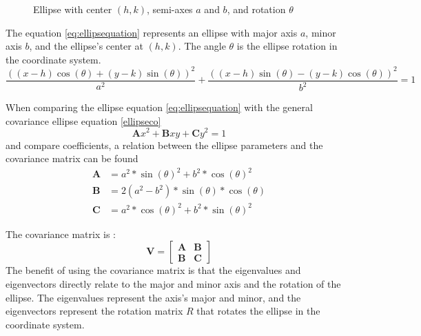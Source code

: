 \begin{figure}[h]
    \centering
    \caption{Ellipse with center $(h,k)$, semi-axes $a$ and $b$, and rotation $\theta$}
    \label{fig:sampleellipse}
\end{figure}
The equation \ref{eq:ellipsequation} represents an ellipse with major axis $a$, minor axis $b$, and the ellipse's center at $(h,k)$. The angle $\theta$ is the ellipse rotation in the coordinate system.
\begin{equation}
    \frac{((x-h)\cos(\theta) + (y-k)\sin(\theta))^2}{a^2} + \frac{((x-h)\sin(\theta) - (y-k)\cos(\theta))^2}{b^2} = 1
    \label{eq:ellipsequation}
\end{equation}

When comparing the ellipse equation \ref{eq:ellipsequation} with the general covariance ellipse equation \ref{ellipseco}
\begin{equation}
    \mathbf{A}x^2 + \mathbf{B}xy + \mathbf{C}y^2 = 1
    \label{ellipseco}
\end{equation} 
and compare coefficients, a relation between the ellipse parameters and the covariance matrix can be found
\begin{align}
    \mathbf{A}&=a^2 * \sin (\theta)^2 + b^2*\cos (\theta)^2 \\
    \mathbf{B}&= 2(a^2-b^2)*\sin (\theta)*\cos (\theta) \\
    \mathbf{C}&= a^2*\cos (\theta)^2 + b^2*\sin (\theta)^2
    \label{coefficients}
\end{align}

The covariance matrix is :
\begin{equation}
    \mathbf{V} = \begin{bmatrix}
        \mathbf{A} & \mathbf{B} \\
        \mathbf{B} & \mathbf{C} 
    \label{covariance}
    \end{bmatrix}
\end{equation}
The benefit of using the covariance matrix is that the eigenvalues and eigenvectors directly relate to the major and minor axis and the rotation of the ellipse. The eigenvalues represent the axis's major and minor, and the eigenvectors represent the rotation matrix $R$ that rotates the ellipse in the coordinate system. 

